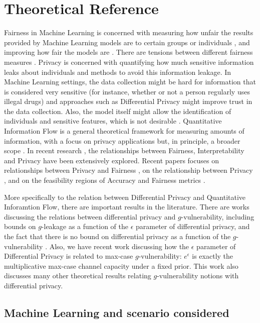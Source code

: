 \documentclass[conference]{IEEEtran}
\begin{document}
\section{Theoretical Reference}

Fairness in Machine Learning is concerned with measuring how unfair the results provided by Machine Learning models are to certain groups or individuals \cite{FairMeasures}, and improving how fair the models are \cite{FairSolve}. There are tensions between different fairness measures \cite{Impossibility}\cite{FairTensions}. Privacy is concerned with quantifying how much sensitive information leaks about individuals and methods to avoid this information leakage. In Machine Learning settings, the data collection might be hard for information that is considered very sensitive (for instance, whether or not a person regularly uses illegal drugs) and approaches such as Differential Privacy \cite{DP} might improve trust in the data collection. Also, the model itself might allow the identification of individuals and sensitive features, which is not desirable \cite{liu2021machine}. Quantitative Information Flow is a general theoretical framework for measuring amounts of information, with a focus on privacy applications but, in principle, a broader scope \cite{QIF}. In recent research \cite{Sok}, the relationships between Fairness, Interpretability and Privacy have been extensively explored. Recent papers focuses on relationships between Privacy and Fairness \cite{Awareness}, on the relationship between Privacy \cite{Rachel}, and on the feasibility regions of Accuracy and Fairness metrics \cite{Carlos}\cite{Reductions}. 

More specifically to the relation between Differential Privacy and Quantitative Inforamtion Flow, there are important results in the literature. There are works discussing the relations between differential privacy and $g$-vulnerability, including bounds on $g$-leakage as a function of the $\epsilon$ parameter of differential privacy, and the fact that there is no bound on differential privacy as a function of the $g$-vulnerability \cite{alvim2015information}. Also, we have recent work \cite{fernandes2022explaining} discussing how the $\epsilon$ parameter of Differential Privacy is related to max-case $g$-vulnerability: $e^\epsilon$ is exactly the multiplicative max-case channel capacity under a fixed prior. This work also discusses many other theoretical results relating $g$-vulnerability notions with differential privacy. 

\subsection{Machine Learning and scenario considered}
\end{document}
